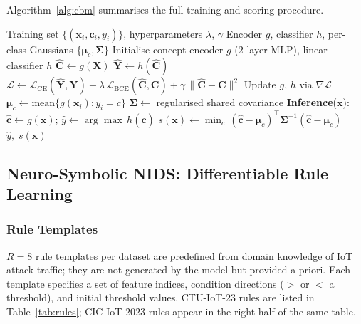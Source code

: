 \documentclass[journal]{IEEEtran}
\begin{document}
Algorithm~\ref{alg:cbm} summarises the full training and scoring
procedure.

\begin{algorithm}[!ht]
\caption{CBM Training and OOD Scoring}
\label{alg:cbm}
\begin{algorithmic}[1]
\Require Training set $\{(\mathbf{x}_i, \mathbf{c}_i, y_i)\}$,
         hyperparameters $\lambda$, $\gamma$
\Ensure  Encoder $g$, classifier $h$,
         per-class Gaussians $\{\boldsymbol{\mu}_c, \boldsymbol{\Sigma}\}$
\State Initialise concept encoder $g$ (2-layer MLP), linear classifier $h$
    \State $\hat{\mathbf{C}} \gets g(\mathbf{X})$
    \State $\hat{\mathbf{Y}} \gets h(\hat{\mathbf{C}})$
    \State $\mathcal{L} \gets \mathcal{L}_{\mathrm{CE}}(\hat{\mathbf{Y}},\mathbf{Y})
             + \lambda\,\mathcal{L}_{\mathrm{BCE}}(\hat{\mathbf{C}},\mathbf{C})
             + \gamma\,\|\hat{\mathbf{C}}-\mathbf{C}\|^2$
    \State Update $g$, $h$ via $\nabla\mathcal{L}$
  \EndFor
\EndFor
{} 
  \State $\boldsymbol{\mu}_c \gets \mathrm{mean}\{g(\mathbf{x}_i) : y_i = c\}$
\EndFor
\State $\boldsymbol{\Sigma} \gets$ regularised shared covariance
\Statex
\Statex \textbf{Inference}($\mathbf{x}$):
\State $\hat{\mathbf{c}} \gets g(\mathbf{x})$;\quad
       $\hat{y} \gets \arg\max\, h(\hat{\mathbf{c}})$
\State $s(\mathbf{x}) \gets \min_c\,
       (\hat{\mathbf{c}}-\boldsymbol{\mu}_c)^\top
       \boldsymbol{\Sigma}^{-1}
       (\hat{\mathbf{c}}-\boldsymbol{\mu}_c)$
\State \Return $\hat{y},\; s(\mathbf{x})$
\end{algorithmic}
\end{algorithm}

\subsection{Neuro-Symbolic NIDS: Differentiable Rule Learning}
\label{sec:nesy}

\subsubsection{Rule Templates}

$R{=}8$ rule templates per dataset are predefined from domain knowledge
of IoT attack traffic; they are not generated by the model but provided
a priori. Each template specifies a set of feature indices, condition
directions ($>$ or $<$ a threshold), and initial threshold values.
CTU-IoT-23 rules are listed in Table~\ref{tab:rules}; CIC-IoT-2023
rules appear in the right half of the same table.
\end{document}
